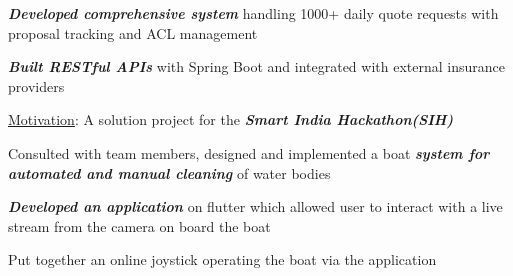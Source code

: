 \documentclass[]{deedy-resume-reversed}
\begin{document}
\begin{minipage}[t]{0.66\textwidth}
\begin{tightemize}
\item \textbf{\emph{Developed comprehensive system}} handling 1000+ daily quote requests with proposal tracking and ACL management
\item \textbf{\emph{Built RESTful APIs}} with Spring Boot and integrated with external insurance providers
\end{tightemize}
\sectionsep


\begin{tightemize}
\item \underline{Motivation}: A solution project for the \textbf{\emph{Smart India Hackathon(SIH)}} 
\item Consulted with team members, designed and implemented a boat \textbf{\emph{system for automated and manual cleaning}} of water bodies
\item \textbf{\emph{Developed an application}} on flutter which allowed user to interact with a live stream from the camera on board the boat 
\item Put together an online joystick operating the boat via the application
\end{tightemize}
\sectionsep



\end{minipage}
\end{document}
